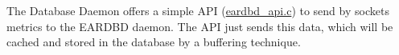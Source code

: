 The Database Daemon offers a simple A\+PI ({\ttfamily \hyperlink{eardbd__api_8c}{eardbd\+\_\+api.\+c}}) to send by sockets metrics to the E\+A\+R\+D\+BD daemon. The A\+PI just sends this data, which will be cached and stored in the database by a buffering technique. 